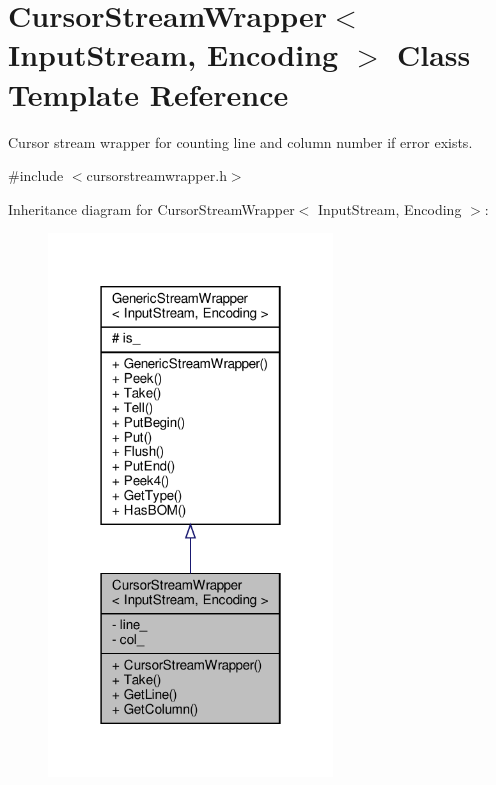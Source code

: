 \hypertarget{classCursorStreamWrapper}{}\section{Cursor\+Stream\+Wrapper$<$ Input\+Stream, Encoding $>$ Class Template Reference}
\label{classCursorStreamWrapper}


Cursor stream wrapper for counting line and column number if error exists.  




{\ttfamily \#include $<$cursorstreamwrapper.\+h$>$}



Inheritance diagram for Cursor\+Stream\+Wrapper$<$ Input\+Stream, Encoding $>$\+:
\nopagebreak
\begin{figure}[H]
\begin{center}
\leavevmode
\includegraphics[width=214pt]{classCursorStreamWrapper__inherit__graph}
\end{center}
\end{figure}


